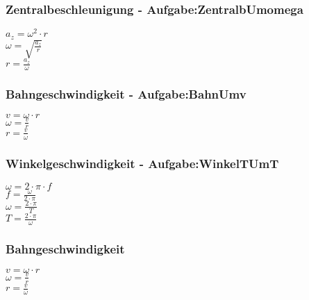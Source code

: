 \subsubsection{Zentralbeschleunigung - Aufgabe:ZentralbUmomega} 
\begin{minipage}{0.45\textwidth} 
$ a_{z}  = \omega ^{2} \cdot r $\\ 
$ \omega  = \sqrt{\frac{a_{z} }{r}} $\\ 
$ r = \frac{a_{z} }{\omega } $\\ 
\end{minipage} 
\begin{minipage}{0.45\textwidth} 
 
\end{minipage} 
\subsubsection{Bahngeschwindigkeit - Aufgabe:BahnUmv} 
\begin{minipage}{0.45\textwidth} 
$ v = \omega \cdot r $\\ 
$ \omega  = \frac{v}{r} $\\ 
$ r = \frac{v}{\omega } $\\ 
\end{minipage} 
\begin{minipage}{0.45\textwidth} 
 
\end{minipage} 
\subsubsection{Winkelgeschwindigkeit - Aufgabe:WinkelTUmT} 
\begin{minipage}{0.45\textwidth} 
$ \omega  = 2\cdot \pi \cdot f $\\ 
$ f = \frac{\omega }{2\cdot \pi } $\\ 
$ \omega  = \frac{2\cdot \pi }{ T} $\\ 
$ T = \frac{2\cdot \pi }{ \omega } $\\ 
\end{minipage} 
\begin{minipage}{0.45\textwidth} 
 
\end{minipage} 
\subsubsection{Bahngeschwindigkeit} 
\begin{minipage}{0.45\textwidth} 
$ v = \omega \cdot r $\\ 
$ \omega  = \frac{v}{r} $\\ 
$ r = \frac{v}{\omega } $\\ 
\end{minipage} 
\begin{minipage}{0.45\textwidth} 
 
\end{minipage} 
